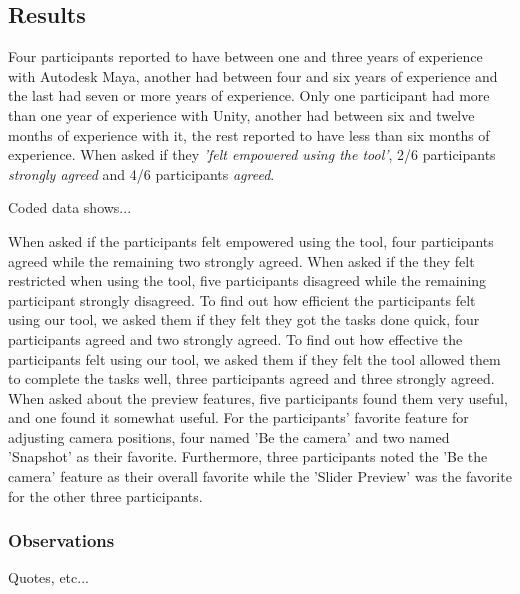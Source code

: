 \subsection{Results} \label{results}
Four participants reported to have between one and three years of experience with Autodesk Maya, another had between four and six years of experience and the last had seven or more years of experience. Only one participant had more than one year of experience with Unity, another had between six and twelve months of experience with it, the rest reported to have less than six months of experience.
When asked if they \textit{'felt empowered using the tool'}, 2/6 participants \textit{strongly agreed} and 4/6 participants \textit{agreed}.

Coded data shows...

When asked if the participants felt empowered using the tool, four participants agreed while the remaining two strongly agreed. When asked if the they felt restricted when using the tool, five participants disagreed while the remaining participant strongly disagreed. To find out how efficient the participants felt using our tool, we asked them if they felt they got the tasks done quick, four participants agreed and two strongly agreed. To find out how effective the participants felt using our tool, we asked them if they felt the tool allowed them to complete the tasks well, three participants agreed and three strongly agreed.
When asked about the preview features, five participants found them very useful, and one found it somewhat useful. For the participants' favorite feature for adjusting camera positions, four named 'Be the camera' and two named 'Snapshot' as their favorite. Furthermore, three participants noted the 'Be the camera' feature as their overall favorite while the 'Slider Preview' was the favorite for the other three participants. 

\subsubsection{Observations}
Quotes, etc...

